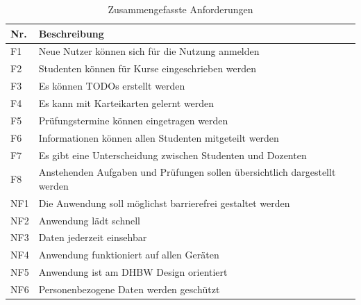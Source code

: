 \begin{table}[h]
    \centering
    \begin{tabularx}{.8\textwidth}{l|X}
        Nr.     & Beschreibung                              \\\hline
        F1      & Neue Nutzer können sich für die Nutzung anmelden                    \\
        F2      & Studenten können für Kurse eingeschrieben werden  \\
        F3      & Es können TODOs erstellt werden   \\
        F4      & Es kann mit Karteikarten gelernt werden  \\
        F5      & Prüfungstermine können eingetragen werden  \\
        F6      & Informationen können allen Studenten mitgeteilt werden  \\
        F7      & Es gibt eine Unterscheidung zwischen Studenten und Dozenten  \\
        F8      & Anstehenden Aufgaben und Prüfungen sollen übersichtlich dargestellt werden  \\\hline
        NF1     & Die Anwendung soll möglichst barrierefrei gestaltet werden\\
        NF2     & Anwendung lädt schnell                    \\
        NF3     & Daten jederzeit einsehbar                 \\
        NF4     & Anwendung funktioniert auf allen Geräten  \\
        NF5     & Anwendung ist am DHBW Design orientiert   \\
        NF6     & Personenbezogene Daten werden geschützt  \\
    \end{tabularx}
    \caption{Zusammengefasste Anforderungen}
    \label{tab:anforderungen}
\end{table}



